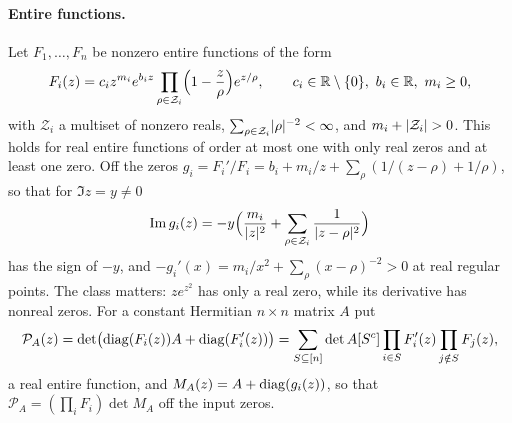 \paragraph{Entire functions.}
Let $F_1,\dots,F_n$ be nonzero entire functions of the form
\begin{equation}\label{zer:eq:realcanonical}
 F_i(z)=c_iz^{m_i}e^{b_iz}\prod_{\rho\in\mathcal Z_i}\Bigl(1-\frac z\rho\Bigr)e^{z/\rho},\qquad
 c_i\in\mathbb{R}\setminus\{0\},\ b_i\in\mathbb{R},\ m_i\ge0,
\end{equation}
with $\mathcal Z_i$ a multiset of nonzero reals, $\sum_{\rho\in\mathcal Z_i}\lvert\rho\rvert^{-2}<\infty$, and
$m_i+\lvert\mathcal Z_i\rvert>0$. This holds for real entire functions of order at most one with only real
zeros and at least one zero. Off the zeros
$g_i=F_i'/F_i=b_i+m_i/z+\sum_\rho(1/(z-\rho)+1/\rho)$, so that for $\Im z=y\ne0$
\begin{equation}\label{zer:eq:logderim}
 \operatorname{Im} g_i(z)=-y\Bigl(\frac{m_i}{\lvert z\rvert^2}+\sum_{\rho\in\mathcal Z_i}\frac1{\lvert z-\rho\rvert^2}\Bigr)
\end{equation}
has the sign of $-y$, and $-g_i'(x)=m_i/x^2+\sum_\rho(x-\rho)^{-2}>0$ at real regular points. The class
matters: $ze^{z^2}$ has only a real zero, while its derivative has nonreal zeros. For a constant
Hermitian $n\times n$ matrix $A$ put
\begin{equation}\label{zer:eq:PA}
 \mathcal P_A(z)=\det\bigl(\operatorname{diag}(F_i(z))A+\operatorname{diag}(F_i'(z))\bigr)
 =\sum_{S\subseteq[n]}\det A[S^c]\prod_{i\in S}F_i'(z)\prod_{j\notin S}F_j(z),
\end{equation}
a real entire function, and $M_A(z)=A+\operatorname{diag}(g_i(z))$, so that
$\mathcal P_A=(\prod_iF_i)\det M_A$ off the input zeros.

